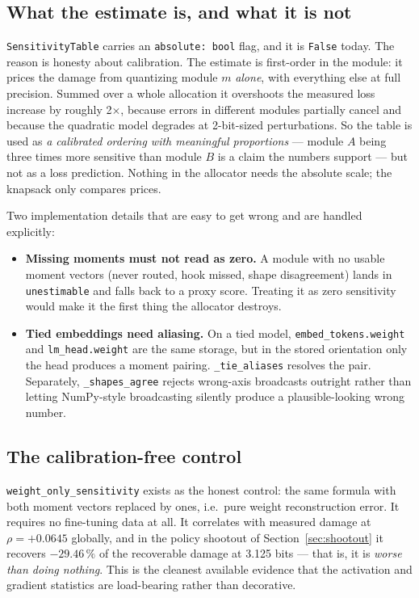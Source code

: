 \documentclass[11pt]{article}
\newcommand{\x}{$\times$}
\newcommand{\pct}{\,\%}
\newcommand{\code}[1]{\texttt{#1}}
\begin{document}
\subsection{What the estimate is, and what it is not}

\code{SensitivityTable} carries an \code{absolute: bool} flag, and it is \code{False} today.
The reason is honesty about calibration. The estimate is first-order in the module: it prices the
damage from quantizing module $m$ \emph{alone}, with everything else at full precision.
Summed over a whole allocation it overshoots the measured loss increase by roughly 2\x, because
errors in different modules partially cancel and because the quadratic model degrades at
2-bit-sized perturbations. So the table is used as \emph{a calibrated ordering with meaningful
proportions} --- module $A$ being three times more sensitive than module $B$ is a claim the
numbers support --- but not as a loss prediction. Nothing in the allocator needs the absolute
scale; the knapsack only compares prices.

Two implementation details that are easy to get wrong and are handled explicitly:

\begin{itemize}
\item \textbf{Missing moments must not read as zero.} A module with no usable moment vectors
(never routed, hook missed, shape disagreement) lands in \code{unestimable} and falls back to a
proxy score. Treating it as zero sensitivity would make it the first thing the allocator
destroys.
\item \textbf{Tied embeddings need aliasing.} On a tied model, \code{embed\_tokens.weight} and
\code{lm\_head.weight} are the same storage, but in the stored orientation only the head produces
a moment pairing. \code{\_tie\_aliases} resolves the pair. Separately, \code{\_shapes\_agree}
rejects wrong-axis broadcasts outright rather than letting NumPy-style broadcasting silently
produce a plausible-looking wrong number.
\end{itemize}

\subsection{The calibration-free control}

\code{weight\_only\_sensitivity} exists as the honest control: the same formula with both moment
vectors replaced by ones, i.e.\ pure weight reconstruction error. It requires no fine-tuning
data at all. It correlates with measured damage at $\rho = +0.0645$ globally, and in the policy
shootout of Section~\ref{sec:shootout} it recovers $-29.46\pct$ of the recoverable damage at
3.125 bits --- that is, it is \emph{worse than doing nothing}. This is the cleanest available
evidence that the activation and gradient statistics are load-bearing rather than decorative.
\end{document}
